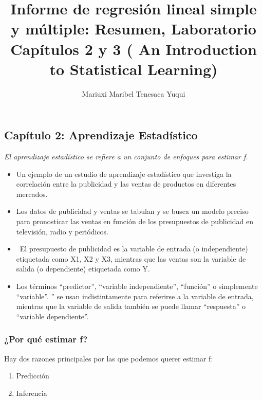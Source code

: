 \documentclass[
  letterpaper,
  DIV=11,
  numbers=noendperiod]{scrartcl}
\title{Informe de regresión lineal simple y múltiple: Resumen,
Laboratorio Capítulos 2 y 3 ( An Introduction to Statistical Learning)}
\author{Mariuxi Maribel Tenesaca Yuqui}
\date{}
\begin{document}
\maketitle
\ifdefined\Shaded\renewenvironment{Shaded}{\begin{tcolorbox}[boxrule=0pt, frame hidden, breakable, borderline west={3pt}{0pt}{shadecolor}, sharp corners, interior hidden, enhanced]}{\end{tcolorbox}}\fi

\hypertarget{capuxedtulo-2-aprendizaje-estaduxedstico}{%
\subsection{Capítulo 2: Aprendizaje
Estadístico}\label{capuxedtulo-2-aprendizaje-estaduxedstico}}

\emph{El aprendizaje estadístico se refiere a un conjunto de enfoques
para estimar f.}

\begin{itemize}
\item
  Un ejemplo de un estudio de aprendizaje estadístico que investiga la
  correlación entre la publicidad y las ventas de productos en
  diferentes mercados.
\item
  Los datos de publicidad y ventas se tabulan y se busca un modelo
  preciso para pronosticar las ventas en función de los presupuestos de
  publicidad en televisión, radio y periódicos.
\item
  ~El presupuesto de publicidad es la variable de entrada (o
  independiente) etiquetada como X1, X2 y X3, mientras que las ventas
  son la variable de salida (o dependiente) etiquetada como Y.
\item
  Los términos ``predictor'', ``variable independiente'', ``función'' o
  simplemente ``variable''. '' se usan indistintamente para referirse a
  la variable de entrada, mientras que la variable de salida también se
  puede llamar ``respuesta'' o ``variable dependiente''.
\end{itemize}

\hypertarget{por-quuxe9-estimar-f}{%
\subsubsection{\texorpdfstring{\textbf{¿Por qué estimar
f?}}{¿Por qué estimar f?}}\label{por-quuxe9-estimar-f}}

Hay dos razones principales por las que podemos querer estimar f:

\begin{enumerate}
\def\labelenumi{\arabic{enumi}.}
\item
  Predicción
\item
  Inferencia
\end{enumerate}
\end{document}
